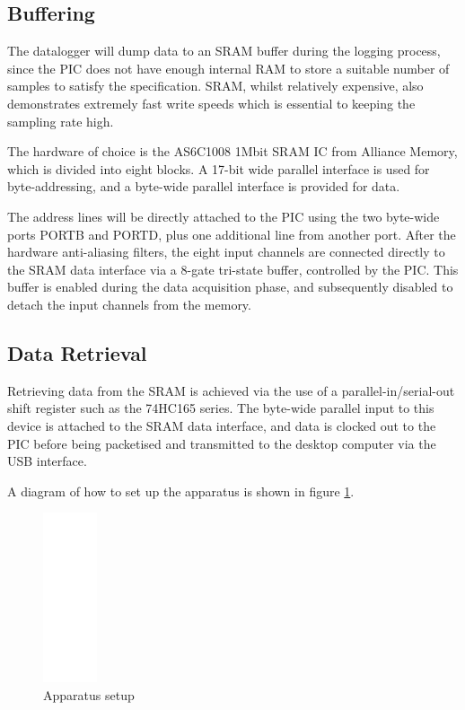 \documentclass[11pt]{article}
\begin{document}
\subsection{Buffering}
    The datalogger will dump data to an SRAM buffer during the logging process,
    since the PIC does not have enough internal RAM to store a suitable number
    of samples to satisfy the specification. SRAM, whilst relatively expensive,
    also demonstrates extremely fast write speeds which is essential to keeping
    the sampling rate high.

    The hardware of choice is the AS6C1008 1Mbit SRAM IC from Alliance Memory, 
    which is divided into eight blocks. A 17-bit wide parallel interface is 
    used for byte-addressing, and a byte-wide parallel interface is provided 
    for data.

    The address lines will be directly attached to the PIC using the two
    byte-wide ports PORTB and PORTD, plus one additional line from another port.
    After the hardware anti-aliasing filters, the eight input channels are
    connected directly to the SRAM data interface via a 8-gate tri-state 
    buffer, controlled by the PIC. This buffer is enabled during the data
    acquisition phase, and subsequently disabled to detach the input channels
    from the memory.

\subsection{Data Retrieval}
    Retrieving data from the SRAM is achieved via the use of a
    parallel-in/serial-out shift register such as the 74HC165 series. The
    byte-wide parallel input to this device is attached to the SRAM data
    interface, and data is clocked out to the PIC before being packetised and
    transmitted to the desktop computer via the USB interface.

    A diagram of how to set up the apparatus is shown in figure \ref{fig:app}.
    
    \begin{figure}
    \centering
    \includegraphics[height=5cm]{blank}
    \caption{Apparatus setup}
    \label{fig:app}
    \end{figure}
	
\end{document}
